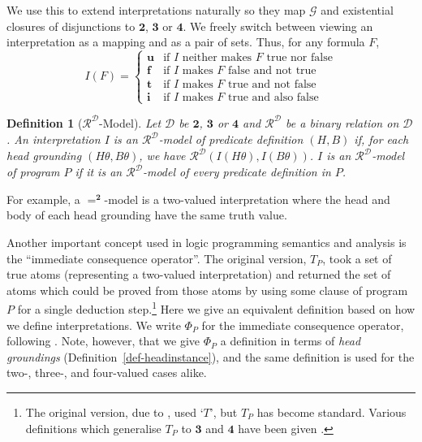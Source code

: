 \documentclass{tlp}
\newtheorem{definition}{Definition}
\newcommand{\Bi}{\ensuremath{\mathbf{2}}}
\newcommand{\Tri}{\ensuremath{\mathbf{3}}}
\newcommand{\Quad}{\ensuremath{\mathbf{4}}}
\newcommand{\Her}{\mathcal{G}}
\begin{document}
We use this to extend interpretations naturally so they map $\Her$ and
existential closures of disjunctions to $\Bi$, $\Tri$ or $\Quad$.
We freely switch between viewing an interpretation as a mapping and
as a pair of sets.
Thus, for any formula $F$,
\[
I(F) = 
  \left\{
  \begin{array}{ll}
     \mathbf{u} & \mbox{if $I$ neither makes $F$ true nor false}
  \\ \mathbf{f} & \mbox{if $I$ makes $F$ false and not true}
  \\ \mathbf{t} & \mbox{if $I$ makes $F$ true and not false}
  \\ \mathbf{i} & \mbox{if $I$ makes $F$ true and also false}
  \end{array}
  \right.
\]

\begin{definition}[$\mathcal{R}^\mathcal{D}$-Model] \rm

Let $\mathcal{D}$ be $\Bi$, $\Tri$ or $\Quad$ and $\mathcal{R}^\mathcal{D}$
be a binary relation on $\mathcal{D}$.
An interpretation $I$ is an $\mathcal{R}^\mathcal{D}$-model
of predicate definition $(H,B)$ if, for each head 
grounding $(H\theta,B\theta)$, we have
$\mathcal{R}^\mathcal{D}(I(H\theta),I(B\theta))$.
$I$ is an $\mathcal{R}^\mathcal{D}$-model of program $P$ if it is an
$\mathcal{R}^\mathcal{D}$-model of every predicate definition in $P$.
\end{definition}
For example, a $=^\Bi$-model is a two-valued interpretation where the
head and body of each head grounding have the same truth value.

Another important concept used in logic programming semantics and analysis
is the ``immediate consequence operator''.  The original version, $T_P$,
took a set of true atoms (representing a two-valued interpretation)
and returned the set of atoms which could be proved from those atoms
by using some clause of program $P$ for a single deduction 
step.\footnote{The original version, due to 
, used `$T$', but $T_P$ has become standard.
Various definitions which generalise $T_P$
to $\Tri$ and $\Quad$ have been given \cite{apt94logic}.}
Here we give an equivalent definition based on how we define 
interpretations.
We write $\Phi_P$ for the immediate consequence operator, following
.
Note, however, that we give $\Phi_P$ a definition in terms of
\emph{head groundings} (Definition~\ref{def-headinstance}),
and the same definition is used for the two-, three-, and
four-valued cases alike.
\end{document}

